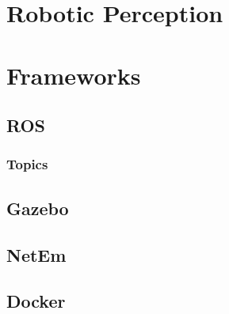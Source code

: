 \section{Robotic Perception}

\section{Frameworks}
\subsection{ROS}
\subsubsection{Topics}
\subsection{Gazebo}
\subsection{NetEm} 
\subsection{Docker}
